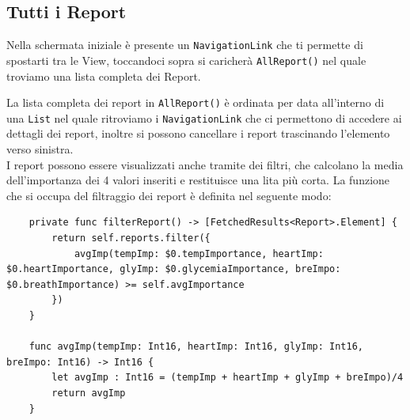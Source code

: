 \documentclass{article}
\begin{document}
\newpage

\subsection{Tutti i Report}

Nella schermata iniziale è presente un \texttt{NavigationLink} che ti permette di spostarti tra le View, toccandoci sopra si caricherà \texttt{AllReport()} nel quale troviamo una lista completa dei Report.

\smallskip

La lista completa dei report in \texttt{AllReport()} è ordinata per data all'interno di una \texttt{List} nel quale ritroviamo i \texttt{NavigationLink} che ci permettono di accedere ai dettagli dei report, inoltre si possono cancellare i report trascinando l'elemento verso sinistra. \\
I report possono essere visualizzati anche tramite dei filtri, che calcolano la media dell'importanza dei 4 valori inseriti e restituisce una lita più corta. La funzione che si occupa del filtraggio dei report è definita nel seguente modo:

\smallskip
\begin{lstlisting}
    private func filterReport() -> [FetchedResults<Report>.Element] {
        return self.reports.filter({
            avgImp(tempImp: $0.tempImportance, heartImp: $0.heartImportance, glyImp: $0.glycemiaImportance, breImpo: $0.breathImportance) >= self.avgImportance
        })
    }
    
    func avgImp(tempImp: Int16, heartImp: Int16, glyImp: Int16, breImpo: Int16) -> Int16 {
        let avgImp : Int16 = (tempImp + heartImp + glyImp + breImpo)/4
        return avgImp
    }
\end{lstlisting}
\end{document}
